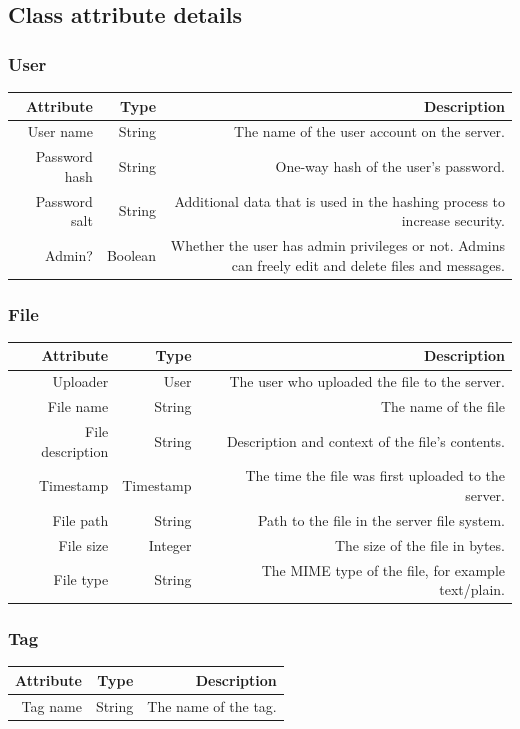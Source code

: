 \documentclass[10pt,a4paper]{article}
\begin{document}
\subsection{Class attribute details}
\subsubsection{User}
\begin{tabularx}{\textwidth}{|R|R|R|} \hline
\textbf{Attribute} & \textbf{Type} & \textbf{Description}\\ \hline
User name & String & The name of the user account on the server.\\ \hline
Password hash & String & One-way hash of the user's password.\\ \hline
Password salt & String & Additional data that is used in the hashing process to increase security.\\ \hline
Admin? & Boolean & Whether the user has admin privileges or not. Admins can freely edit and delete files and messages.\\ \hline
\end{tabularx}

\subsubsection{File}
\begin{tabularx}{\textwidth}{|R|R|R|} \hline
\textbf{Attribute} & \textbf{Type} & \textbf{Description}\\ \hline
Uploader & User & The user who uploaded the file to the server.\\ \hline
File name & String & The name of the file\\ \hline
File description & String & Description and context of the file's contents.\\ \hline
Timestamp & Timestamp & The time the file was first uploaded to the server.\\ \hline
File path & String & Path to the file in the server file system.\\ \hline
File size & Integer & The size of the file in bytes.\\ \hline
File type & String & The MIME type of the file, for example text/plain.\\ \hline
\end{tabularx}

\subsubsection{Tag}
\begin{tabularx}{\textwidth}{|R|R|R|} \hline
\textbf{Attribute} & \textbf{Type} & \textbf{Description}\\ \hline
Tag name & String & The name of the tag.\\ \hline
\end{tabularx}
\end{document}
